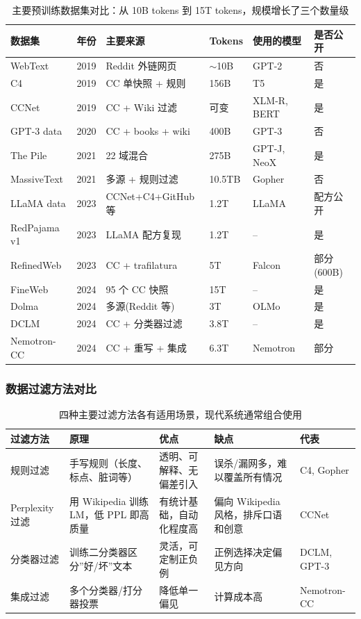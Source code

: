 \begin{table}[H]
\centering
\small
\begin{tabular}{p{}p{}p{}p{}p{}p{}}
\toprule
\textbf{数据集} & \textbf{年份} & \textbf{主要来源} & \textbf{Tokens} & \textbf{使用的模型} & \textbf{是否公开} \\
\midrule
WebText & 2019 & Reddit 外链网页 & $\sim$10B & GPT-2 & 否 \\
C4 & 2019 & CC 单快照 + 规则 & 156B & T5 & 是 \\
CCNet & 2019 & CC + Wiki 过滤 & 可变 & XLM-R, BERT & 是 \\
GPT-3 data & 2020 & CC + books + wiki & 400B & GPT-3 & 否 \\
The Pile & 2021 & 22 域混合 & 275B & GPT-J, NeoX & 是 \\
MassiveText & 2021 & 多源 + 规则过滤 & 10.5TB & Gopher & 否 \\
LLaMA data & 2023 & CCNet+C4+GitHub 等 & 1.2T & LLaMA & 配方公开 \\
RedPajama v1 & 2023 & LLaMA 配方复现 & 1.2T & -- & 是 \\
RefinedWeb & 2023 & CC + trafilatura & 5T & Falcon & 部分(600B) \\
FineWeb & 2024 & 95 个 CC 快照 & 15T & -- & 是 \\
Dolma & 2024 & 多源(Reddit 等) & 3T & OLMo & 是 \\
DCLM & 2024 & CC + 分类器过滤 & 3.8T & -- & 是 \\
Nemotron-CC & 2024 & CC + 重写 + 集成 & 6.3T & Nemotron & 部分 \\
\bottomrule
\end{tabular}
\caption{主要预训练数据集对比：从 10B tokens 到 15T tokens，规模增长了三个数量级}
\end{table}

\subsubsection{数据过滤方法对比}

\begin{table}[H]
\centering
\begin{tabular}{p{}p{}p{}p{}p{}}
\toprule
\textbf{过滤方法} & \textbf{原理} & \textbf{优点} & \textbf{缺点} & \textbf{代表} \\
\midrule
规则过滤 & 手写规则（长度、标点、脏词等） & 透明、可解释、无偏差引入 & 误杀/漏网多，难以覆盖所有情况 & C4, Gopher \\
Perplexity 过滤 & 用 Wikipedia 训练 LM，低 PPL 即高质量 & 有统计基础，自动化程度高 & 偏向 Wikipedia 风格，排斥口语和创意 & CCNet \\
分类器过滤 & 训练二分类器区分”好/坏”文本 & 灵活，可定制正负例 & 正例选择决定偏见方向 & DCLM, GPT-3 \\
集成过滤 & 多个分类器/打分器投票 & 降低单一偏见 & 计算成本高 & Nemotron-CC \\
\bottomrule
\end{tabular}
\caption{四种主要过滤方法各有适用场景，现代系统通常组合使用}
\end{table}

